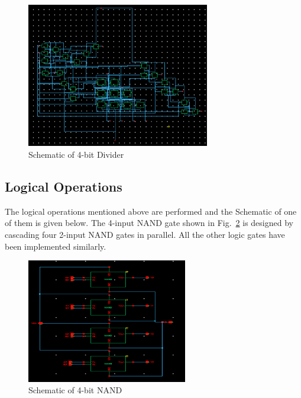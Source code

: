 \documentclass[conference]{IEEEtran}
\begin{document}
\begin{figure}[H]
\centerline{\includegraphics[width=8cm,keepaspectratio,]{"4bit_Divider.png"}}
\caption{Schematic of 4-bit  Divider}
\label{fig6}
\end{figure}

\subsection{Logical Operations}\label{DB}
The logical operations mentioned above are performed and the Schematic of one of them is given below. The 4-input NAND gate shown in Fig.~\ref{fig7} is designed by cascading four 2-input NAND gates in parallel. All the other logic gates have been implemented similarly.
\begin{figure}[H]
\centerline{\includegraphics[width=7cm,keepaspectratio,]{"4bit_NAND.png"}}
\caption{Schematic of 4-bit NAND}
\label{fig7}
\end{figure}
\end{document}
